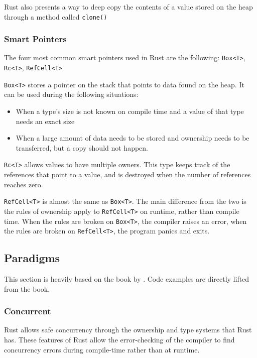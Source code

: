 \documentclass{article}
\newcommand{\rustin}[1]{\texttt{#1}}
\begin{document}
  Rust also presents a way to deep copy the contents of a value stored on the
  heap through a method called \rustin{clone()}

  \subsubsection{Smart Pointers}
  The four most common smart pointers used in Rust are the following:
  \rustin{Box<T>}, \rustin{Rc<T>}, \rustin{RefCell<T>}

  \rustin{Box<T>} stores a pointer on the stack that points to data found on the
  heap. It can be used during the following situations:
  \begin{itemize}
    \item When a type's size is not known on compile time and a value of that
          type needs an exact size
    \item When a large amount of data needs to be stored and ownership needs to
          be transferred, but a copy should not happen.
  \end{itemize}

  \rustin{Rc<T>} allows values to have multiple owners. This type keeps track of
  the references that point to a value, and is destroyed when the number of
  references reaches zero.

  \rustin{RefCell<T>} is almost the same as \rustin{Box<T>}. The main difference
  from the two is the rules of ownership apply to \rustin{RefCell<T>} on
  runtime, rather than compile time. When the rules are broken on
  \rustin{Box<T>}, the compiler raises an error, when the rules are broken on
  \rustin{RefCell<T>}, the program panics and exits.

  \subsection{Paradigms}

  This section is heavily based on the book  by
  \cite{klabnik_nichols_2018}. Code examples are directly lifted from the book.

  \subsubsection{Concurrent}
  Rust allows safe concurrency through the ownership and type systems that Rust
  has. These features of Rust allow the error-checking of the compiler to find
  concurrency errors during compile-time rather than at runtime.
\end{document}
